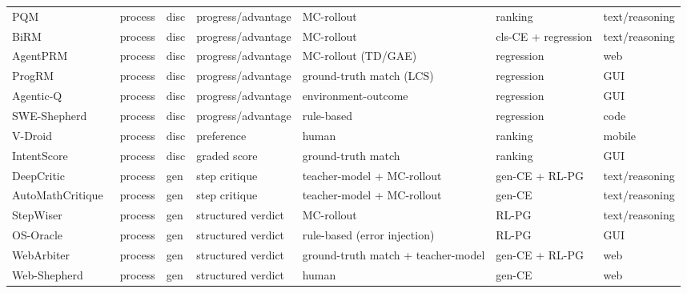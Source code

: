 \begin{table}[htbp]
{\begin{tabular}{@{}lllllll@{}}
PQM~\cite{Li24m}                & process & disc & progress/advantage        & MC-rollout                             & ranking         & text/reasoning  \\
BiRM~\cite{Che25s}              & process & disc & progress/advantage        & MC-rollout                             & cls-CE + regression & text/reasoning \\
AgentPRM~\cite{Xi25b}           & process & disc & progress/advantage        & MC-rollout (TD/GAE)                    & regression      & web             \\
ProgRM~\cite{Zha25z}            & process & disc & progress/advantage        & ground-truth match (LCS)               & regression      & GUI             \\
Agentic-Q~\cite{Wan26s}         & process & disc & progress/advantage        & environment-outcome                    & regression      & GUI             \\
SWE-Shepherd~\cite{Dih26}       & process & disc & progress/advantage        & rule-based                             & regression      & code            \\
V-Droid~\cite{Dai25}            & process & disc & preference                & human                                  & ranking         & mobile          \\
IntentScore~\cite{Che26s}       & process & disc & graded score              & ground-truth match                     & ranking         & GUI             \\
\addlinespace[3pt]
DeepCritic~\cite{Yan25u}        & process & gen  & step critique             & teacher-model + MC-rollout             & gen-CE + RL-PG  & text/reasoning  \\
AutoMathCritique~\cite{Xi24}    & process & gen  & step critique             & teacher-model + MC-rollout             & gen-CE          & text/reasoning  \\
StepWiser~\cite{Xio25c}         & process & gen  & structured verdict        & MC-rollout                             & RL-PG           & text/reasoning  \\
OS-Oracle~\cite{Wu25m}          & process & gen  & structured verdict        & rule-based (error injection)           & RL-PG           & GUI             \\
WebArbiter~\cite{Zha26ab}       & process & gen  & structured verdict        & ground-truth match + teacher-model     & gen-CE + RL-PG  & web             \\
Web-Shepherd~\cite{Cha25b}      & process & gen  & structured verdict        & human                                  & gen-CE          & web             \\

\end{tabular}}
\end{table}
